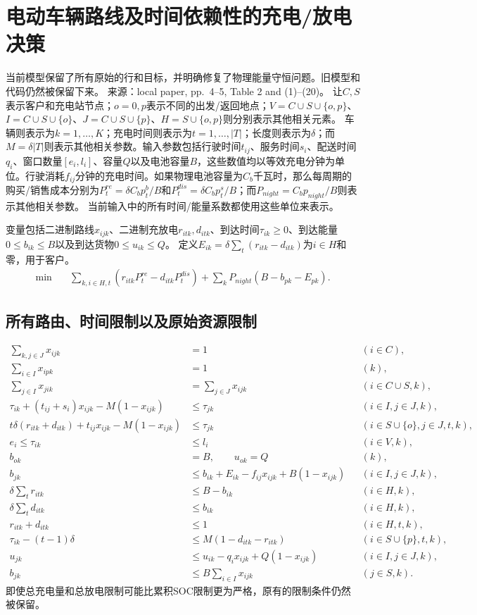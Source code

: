 \documentclass{article}
\begin{document}
\section*{电动车辆路线及时间依赖性的充电/放电决策}
当前模型保留了所有原始的行和目标，并明确修复了物理能量守恒问题。旧模型和代码仍然被保留下来。  
来源：local paper, pp.\ 4--5, Table 2 and (1)--(20)。  
让$C,S$表示客户和充电站节点；$o=0,p$表示不同的出发/返回地点；$V=C\cup S\cup\{o,p\}$、$I=C\cup S\cup\{o\}$、$J=C\cup S\cup\{p\}$、$H=S\cup\{o,p\}$则分别表示其他相关元素。  
车辆则表示为$k=1,\ldots,K$；充电时间则表示为$t=1,\ldots,|T|$；长度则表示为$\delta$；而$M=\delta|T|$则表示其他相关参数。输入参数包括行驶时间$t_{ij}$、服务时间$s_i$、配送时间$q_i$、窗口数量$[e_i,l_i]$、容量$Q$以及电池容量$B$，这些数值均以等效充电分钟为单位。行驶消耗$f_{ij}$分钟的充电时间。如果物理电池容量为$C_b$千瓦时，那么每周期的购买/销售成本分别为$P_t^{re}=\delta C_bp_t^b/B$和$P_t^{dis}=\delta C_bp_t^s/B$；而$P_{night}=C_bp_{night}/B$则表示其他相关参数。  
当前输入中的所有时间/能量系数都使用这些单位来表示。

变量包括二进制路线$x_{ijk}$、二进制充放电$r_{itk},d_{itk}$、到达时间$\tau_{ik}\ge0$、到达能量$0\le b_{ik}\le B$以及到达货物$0\le u_{ik}\le Q$。
定义$E_{ik}=\delta\sum_t(r_{itk}-d_{itk})$为$i\in H$和零，用于客户。
\begin{align*}
\min\quad&
\sum_{k,i\in H,t}(r_{itk}P_t^{re}-d_{itk}P_t^{dis})
+\sum_kP_{night}(B-b_{pk}-E_{pk}).
\end{align*}
\subsection*{所有路由、时间限制以及原始资源限制}
\begin{align}
\sum_{k,j\in J}x_{ijk}&=1 &&(i\in C),\\
\sum_{i\in I}x_{ipk}&=1 &&(k),\\
\sum_{j\in I}x_{jik}&=\sum_{j\in J}x_{ijk} &&(i\in C\cup S,k),\\
\tau_{ik}+(t_{ij}+s_i)x_{ijk}-M(1-x_{ijk})&\le\tau_{jk}&&(i\in I,j\in J,k),\\
t\delta(r_{itk}+d_{itk})+t_{ij}x_{ijk}-M(1-x_{ijk})&\le\tau_{jk}&&(i\in S\cup\{o\},j\in J,t,k),\\
e_i\le\tau_{ik}&\le l_i&&(i\in V,k),\\
b_{ok}&=B,\qquad u_{ok}=Q&&(k),\\
b_{jk}&\le b_{ik}+E_{ik}-f_{ij}x_{ijk}+B(1-x_{ijk})&&(i\in I,j\in J,k),\\
\delta\sum_t r_{itk}&\le B-b_{ik}&&(i\in H,k),\\
\delta\sum_t d_{itk}&\le b_{ik}&&(i\in H,k),\\
r_{itk}+d_{itk}&\le1&&(i\in H,t,k),\\
\tau_{ik}-(t-1)\delta&\le M(1-d_{itk}-r_{itk})&&(i\in S\cup\{p\},t,k),\\
u_{jk}&\le u_{ik}-q_ix_{ijk}+Q(1-x_{ijk})&&(i\in I,j\in J,k),\\
b_{jk}&\le B\sum_{i\in I}x_{ijk}&&(j\in S,k).
\end{align}
即使总充电量和总放电限制可能比累积SOC限制更为严格，原有的限制条件仍然被保留。
\end{document}
